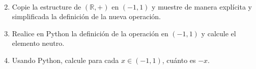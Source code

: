 \documentclass{report}
\begin{document}
\begin{enumerate}
\begin{align*}
        \end{align*}

        \item Copie la estructure de $(\mathbb{R}, +)$ en $(-1, 1)$ y muestre de manera explícita y simplificada la definición de la nueva operación.
        \item Realice en Python la definición de la operación en $(-1, 1)$ y calcule el elemento neutro.
        \item Usando Python, calcule para cada $x \in (-1, 1)$, cuánto es $-x$.
    \end{enumerate}
\end{document}
